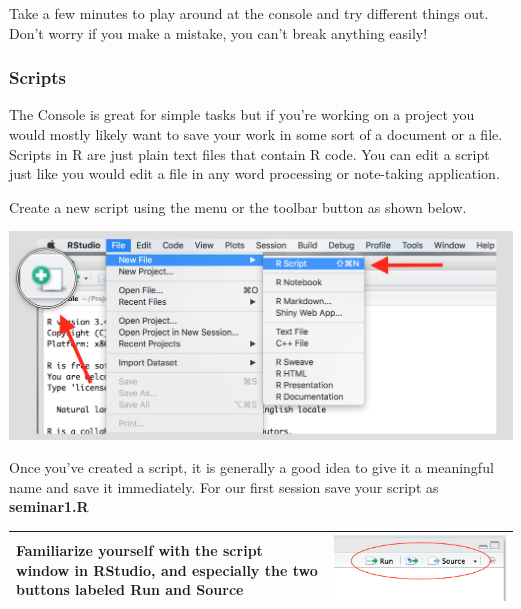 \documentclass[]{article}
\begin{document}
Take a few minutes to play around at the console and try different things out. Don't worry if you make a mistake, you can't break anything easily!

\hypertarget{scripts}{%
\subsubsection{Scripts}\label{scripts}}

The Console is great for simple tasks but if you're working on a project you would mostly likely want to save your work in some sort of a document or a file. Scripts in R are just plain text files that contain R code. You can edit a script just like you would edit a file in any word processing or note-taking application.

Create a new script using the menu or the toolbar button as shown below.

\includegraphics{./img/rstudio_newfile.png}

Once you've created a script, it is generally a good idea to give it a meaningful name and save it immediately. For our first session save your script as \textbf{seminar1.R}

\begin{longtable}[]{@{}ll@{}}
\toprule
\endhead
\begin{minipage}[t]{0.52\columnwidth}\raggedright
Familiarize yourself with the script window in RStudio, and especially the two buttons labeled \textbf{Run} and \textbf{Source}\strut
\end{minipage} & \begin{minipage}[t]{0.42\columnwidth}\raggedright
\includegraphics{./img/rstudio_script.png}\strut
\end{minipage}\tabularnewline
\bottomrule
\end{longtable}
\end{document}

